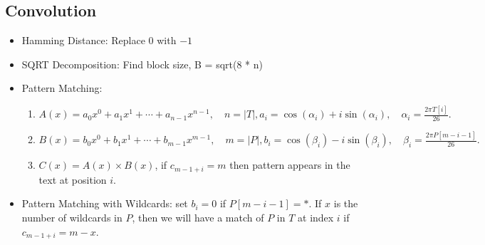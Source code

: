 {\subsection{Convolution}
\begin{itemize}[leftmargin=*, noitemsep]
  \item Hamming Distance: Replace \( 0 \) with \( -1 \)
  \item SQRT Decomposition: Find block size, B = sqrt(8 * n)
  \item Pattern Matching: 
  \begin{enumerate}[leftmargin=0.2cm, noitemsep]
    \item $A(x) = a_0x^0 + a_1x^1 + \cdots + a_{n-1}x^{n-1}, \quad n = |T|, a_i = \cos(\alpha_i) + i \sin(\alpha_i), \quad \alpha_i = \frac{2\pi T[i]}{26}.$
    \item $B(x) = b_0x^0 + b_1x^1 + \cdots + b_{m-1}x^{m-1}, \quad m = |P|, b_i = \cos(\beta_i) - i \sin(\beta_i), \quad \beta_i = \frac{2\pi P[m - i - 1]}{26}.$
    \item $C(x) = A(x) \times B(x)$, if $c_{m - 1 + i} = m$ then pattern appears in the text at position $i$.
  \end{enumerate}
  \item Pattern Matching with Wildcards: set $b_i = 0$ if $P[m-i-1] = *$. If $x$ is the number of wildcards in $P$, then we will have a match of $P$ in $T$ at index $i$ if $c_{m-1+i} = m - x$.
\end{itemize}
}